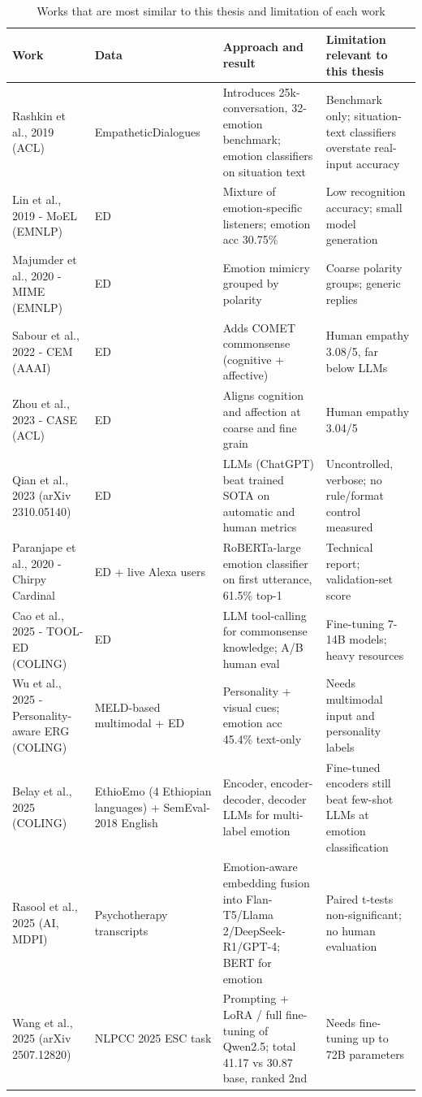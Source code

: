 \begin{table}[htbp]
\centering
\footnotesize
\caption{Works that are most similar to this thesis and limitation of each work}
\label{tab:2.1}
\begin{tabularx}{\textwidth}{@{}lXXX@{}}
\toprule
\textbf{Work} & \textbf{Data} & \textbf{Approach and result} & \textbf{Limitation relevant to this thesis} \\
\midrule
Rashkin et al., 2019 (ACL) & EmpatheticDialogues & Introduces 25k-conversation, 32-emotion benchmark; emotion classifiers on situation text & Benchmark only; situation-text classifiers overstate real-input accuracy \\
Lin et al., 2019 - MoEL (EMNLP) & ED & Mixture of emotion-specific listeners; emotion acc 30.75\% & Low recognition accuracy; small model generation \\
Majumder et al., 2020 - MIME (EMNLP) & ED & Emotion mimicry grouped by polarity & Coarse polarity groups; generic replies \\
Sabour et al., 2022 - CEM (AAAI) & ED & Adds COMET commonsense (cognitive + affective) & Human empathy 3.08/5, far below LLMs \\
Zhou et al., 2023 - CASE (ACL) & ED & Aligns cognition and affection at coarse and fine grain & Human empathy 3.04/5 \\
Qian et al., 2023 (arXiv 2310.05140) & ED & LLMs (ChatGPT) beat trained SOTA on automatic and human metrics & Uncontrolled, verbose; no rule/format control measured \\
Paranjape et al., 2020 - Chirpy Cardinal & ED + live Alexa users & RoBERTa-large emotion classifier on first utterance, 61.5\% top-1 & Technical report; validation-set score \\
Cao et al., 2025 - TOOL-ED (COLING) & ED & LLM tool-calling for commonsense knowledge; A/B human eval & Fine-tuning 7-14B models; heavy resources \\
Wu et al., 2025 - Personality-aware ERG (COLING) & MELD-based multimodal + ED & Personality + visual cues; emotion acc 45.4\% text-only & Needs multimodal input and personality labels \\
Belay et al., 2025 (COLING) & EthioEmo (4 Ethiopian languages) + SemEval-2018 English & Encoder, encoder-decoder, decoder LLMs for multi-label emotion & Fine-tuned encoders still beat few-shot LLMs at emotion classification \\
Rasool et al., 2025 (AI, MDPI) & Psychotherapy transcripts & Emotion-aware embedding fusion into Flan-T5/Llama 2/DeepSeek-R1/GPT-4; BERT for emotion & Paired t-tests non-significant; no human evaluation \\
Wang et al., 2025 (arXiv 2507.12820) & NLPCC 2025 ESC task & Prompting + LoRA / full fine-tuning of Qwen2.5; total 41.17 vs 30.87 base, ranked 2nd & Needs fine-tuning up to 72B parameters \\
\bottomrule
\end{tabularx}
\end{table}

